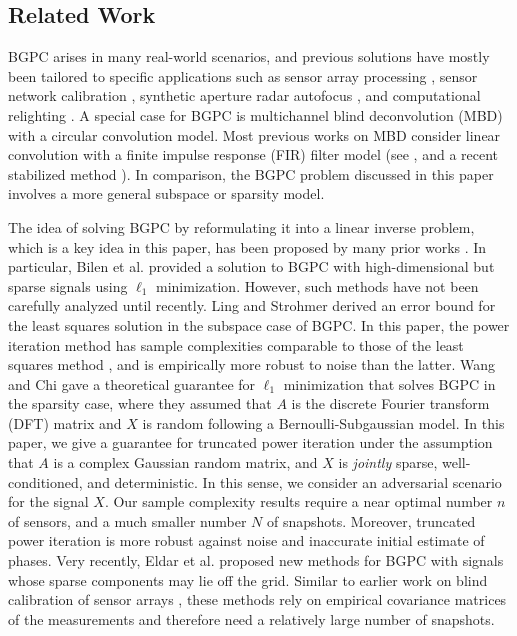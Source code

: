 \documentclass[11pt,journal]{IEEEtran}
\newcommand{\insrt}[1]{{\color{red}#1}}
\begin{document}
\subsection{Related Work} \label{sec:related}

BGPC arises in many real-world scenarios, and previous solutions have mostly been tailored to specific applications such as sensor array processing \cite{Paulraj1985,Rockah1988,Weiss1990}, sensor network calibration \cite{Balzano2007,Lipor2014}, synthetic aperture radar autofocus \cite{Morrison2009}, and computational relighting \cite{Nguyen2013}. 
A special case for BGPC is multichannel blind deconvolution (MBD) with a circular convolution model. Most previous works on MBD consider linear convolution with a finite impulse response (FIR) filter model (see \cite{Tong1991,Moulines1995,Harikumar1998,Harikumar1999}, and a recent stabilized method \cite{Lee2017a,Lee2016}). In comparison, the BGPC problem discussed in this paper involves a more general subspace or sparsity model.

The idea of solving BGPC by reformulating it into a linear inverse problem, which is a key idea in this paper, has been proposed by many prior works \cite{Balzano2007,Morrison2009,Nguyen2013}. In particular, Bilen et al. \cite{Bilen2014} provided a solution to BGPC with high-dimensional but sparse signals using $\ell_1$ minimization. However, such methods have not been carefully analyzed until recently. 
Ling and Strohmer \cite{Ling2016} derived an error bound for the least squares solution in the subspace case of BGPC. In this paper, the power iteration method has sample complexities comparable to those of the least squares method \cite{Ling2016}, and is empirically more robust to noise than the latter. 
Wang and Chi \cite{Wang2016} gave a theoretical guarantee for $\ell_1$ minimization that solves BGPC in the sparsity case, where they assumed that $A$ is the discrete Fourier transform (DFT) matrix and $X$ is random following a Bernoulli-Subgaussian model. 
In this paper, we give a guarantee for truncated power iteration under the assumption that $A$ is a complex Gaussian random matrix, and $X$ is \emph{jointly} sparse, well-conditioned, and deterministic. In this sense, we consider an adversarial scenario for the signal $X$. Our sample complexity results require a near optimal number $n$ of sensors, and a much smaller number $N$ of snapshots. Moreover, truncated power iteration is more robust against noise and inaccurate initial estimate of phases. 
Very recently, Eldar et al. \cite{Eldar2017} proposed new methods for BGPC with signals whose sparse components may lie off the grid. Similar to earlier work on blind calibration of sensor arrays \cite{Paulraj1985}, these methods rely on empirical covariance matrices of the measurements and therefore need a relatively large number of snapshots.
\end{document}
